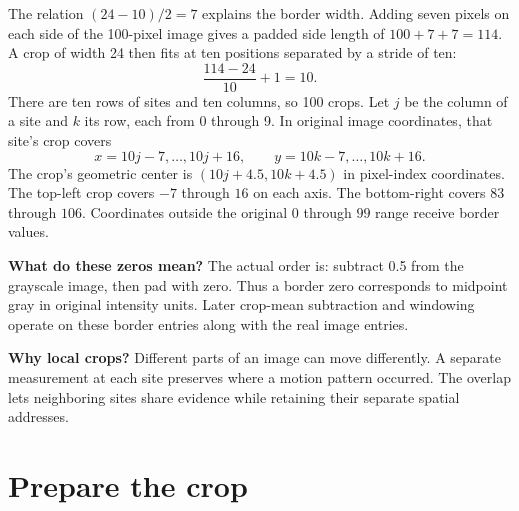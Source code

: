 \documentclass[11pt,letterpaper]{article}
\begin{document}
The relation $(24-10)/2=7$ explains the border width. Adding seven pixels on each side of the 100-pixel image gives a padded side length of $100+7+7=114$. A crop of width 24 then fits at ten positions separated by a stride of ten:
\[
\frac{114-24}{10}+1=10.
\]
There are ten rows of sites and ten columns, so 100 crops. Let $j$ be the column of a site and $k$ its row, each from 0 through 9. In original image coordinates, that site's crop covers
\[
x=10j-7,\ldots,10j+16,\qquad y=10k-7,\ldots,10k+16.
\]
The crop's geometric center is $(10j+4.5,10k+4.5)$ in pixel-index coordinates. The top-left crop covers $-7$ through $16$ on each axis. The bottom-right covers $83$ through $106$. Coordinates outside the original $0$ through $99$ range receive border values.

\begin{center}
\end{center}
\textbf{What do these zeros mean?} The actual order is: subtract 0.5 from the grayscale image, then pad with zero. Thus a border zero corresponds to midpoint gray in original intensity units. Later crop-mean subtraction and windowing operate on these border entries along with the real image entries.

\textbf{Why local crops?} Different parts of an image can move differently. A separate measurement at each site preserves where a motion pattern occurred. The overlap lets neighboring sites share evidence while retaining their separate spatial addresses.

\clearpage
\section{Prepare the crop}\label{sec3}
\end{document}
